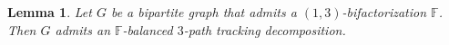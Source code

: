 \documentclass[12pt,reqno,a4paper]{amsart}
\newtheorem{lemma}[theorem]{Lemma}
\begin{document}



\begin{lemma}\label{lemma:3-PD}
	Let \(G\) be a bipartite graph that admits a 
	\((1,3)\)-bifactorization \(\mathbb{F}\).
	Then \(G\) admits an \(\mathbb{F}\)-balanced $3$-path tracking decomposition.
\end{lemma}
\end{document}
